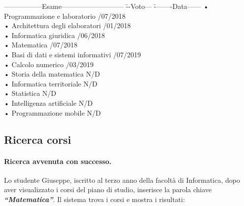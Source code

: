 \begin{tabbing}
	\hspace{1cm}-----------------Esame--------------------------- \= --Voto--- \= --------Data------ \kill
	\hspace{1cm} • Programmazione e laboratorio  /07/2018 \\
	\hspace{1cm} • Architettura degli elaboratori  /01/2018 \\
	\hspace{1cm} • Informatica giuridica  /06/2018 \\
	\hspace{1cm} • Matematica  /07/2018 \\
	\hspace{1cm} • Basi di dati e sistemi informativi  /07/2019 \\
	\hspace{1cm} • Calcolo numerico  /03/2019 \\
	\hspace{1cm} • Storia della matematica \> N/D \>\\
	\hspace{1cm} • Informatica territoriale \> N/D \>\\
	\hspace{1cm} • Statistica \> N/D \>\\
	\hspace{1cm} • Intelligenza artificiale \> N/D \>\\
	\hspace{1cm} • Programmazione mobile \> N/D \>\\
\end{tabbing}

\subsection{Ricerca corsi}
\paragraph{Ricerca avvenuta con successo.} 
Lo studente Giuseppe, iscritto al terzo anno della facoltà di Informatica, dopo aver visualizzato i corsi del piano di studio, inserisce la parola chiave \textbf{\textit{“Matematica”}}. Il sistema trova i corsi e mostra i risultati:

